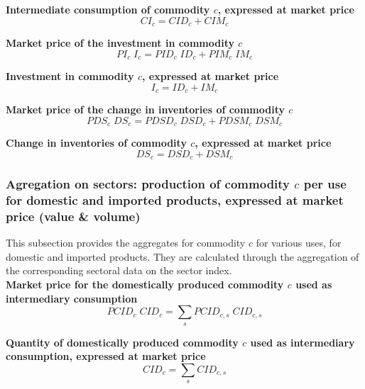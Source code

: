 \documentclass[12pt]{article}
\numberwithin{equation}{section}
\begin{document}
\noindent \textbf{Intermediate consumption of commodity $c$, expressed at market price} 
\begin{dmath}
CI_{c} = CID_{c} + CIM_{c}
\label{SU.mdlCI[c]}
\end{dmath}

\noindent \textbf{Market price of the investment in commodity $c$} 
\begin{dmath}
PI_{c} \; I_{c} = PID_{c} \; ID_{c} + PIM_{c} \; IM_{c}
\label{SU.mdlPI[c]}
\end{dmath}

\noindent \textbf{Investment in commodity $c$, expressed at market price} 
\begin{dmath}
I_{c} = ID_{c} + IM_{c}
\label{SU.mdlI[c]}
\end{dmath}

\noindent \textbf{Market price of the change in inventories of commodity $c$} 
\begin{dmath}
PDS_{c} \; DS_{c} = PDSD_{c} \; DSD_{c} + PDSM_{c} \; DSM_{c}
\label{SU.mdlPDS[c]}
\end{dmath}

\noindent \textbf{Change in inventories of commodity $c$, expressed at market price} 
\begin{dmath}
DS_{c} = DSD_{c} + DSM_{c}
\label{SU.mdlDS[c]}
\end{dmath}



\subsubsection{Agregation on sectors: production of commodity $c$ per use for domestic and imported products, expressed at market price (value \& volume)}


This subsection provides the aggregates for commodity $c$ for various uses, for domestic and imported products. They are calculated through the aggregation of the corresponding sectoral data on the sector index. \\

\noindent \textbf{Market price for the domestically produced commodity $c$ used as intermediary consumption} 
\begin{dmath}
PCID_{c} \; CID_{c} = \sum_{s} PCID_{c, s} \; CID_{c, s}
\label{SU.mdlPCID[c]}
\end{dmath}

\noindent \textbf{Quantity of domestically produced commodity $c$ used as intermediary consumption, expressed at market price} 
\begin{dmath}
CID_{c} = \sum_{s} CID_{c, s}
\label{SU.mdlCID[c]}
\end{dmath}
\end{document}
